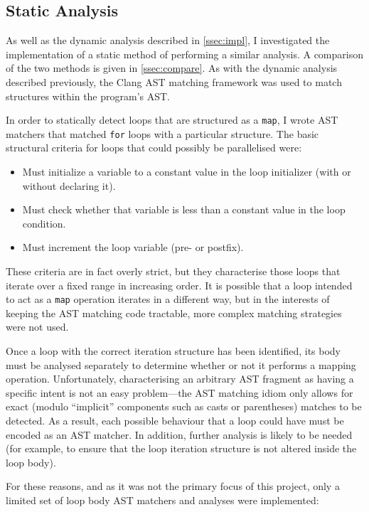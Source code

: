 \documentclass[journal]{IEEEtran}
\begin{document}
\subsection{Static Analysis} \label{ssec:static}

As well as the dynamic analysis described in \autoref{ssec:impl}, I investigated
the implementation of a static method of performing a similar analysis. A
comparison of the two methods is given in \autoref{ssec:compare}. As with the
dynamic analysis described previously, the Clang AST matching framework was used
to match structures within the program's AST.

In order to statically detect loops that are structured as a \texttt{map}, I
wrote AST matchers that matched \texttt{for} loops with a particular structure.
The basic structural criteria for loops that could possibly be parallelised
were:

\begin{itemize}
  \item Must initialize a variable to a constant value in the loop initializer
    (with or without declaring it).
  \item Must check whether that variable is less than a constant value in the
    loop condition.
  \item Must increment the loop variable (pre- or postfix).
\end{itemize}

These criteria are in fact overly strict, but they characterise those loops that
iterate over a fixed range in increasing order. It is possible that a loop
intended to act as a \texttt{map} operation iterates in a different way, but in
the interests of keeping the AST matching code tractable, more complex matching
strategies were not used.

Once a loop with the correct iteration structure has been identified, its body
must be analysed separately to determine whether or not it performs a mapping
operation. Unfortunately, characterising an arbitrary AST fragment as having a
specific intent is not an easy problem---the AST matching idiom only allows for
exact (modulo ``implicit'' components such as casts or parentheses) matches to
be detected. As a result, each possible behaviour that a loop could have must
be encoded as an AST matcher. In addition, further analysis is likely to be
needed (for example, to ensure that the loop iteration structure is not altered
inside the loop body).

For these reasons, and as it was not the primary focus of this project, only a
limited set of loop body AST matchers and analyses were implemented:
\end{document}
